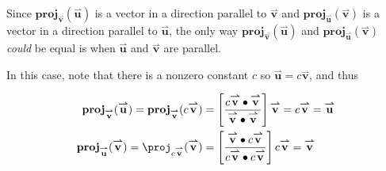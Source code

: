 \documentclass{ximera}
\begin{document}
\begin{exercise}
\begin{selectAll}
\begin{hint}
\begin{problem}
\begin{question}
\begin{itemize}
Since $\mathbf{proj}_{\overset{\boldsymbol{\rightharpoonup}}{\mathbf{v}}}(\overset{\boldsymbol{\rightharpoonup}}{\mathbf{u}})$ is a vector in a direction parallel to $\overset{\boldsymbol{\rightharpoonup}}{\mathbf{v}}$ and $\mathbf{proj}_{\overset{\boldsymbol{\rightharpoonup}}{\mathbf{u}}}(\overset{\boldsymbol{\rightharpoonup}}{\mathbf{v}})$ is a vector in a direction parallel to $\overset{\boldsymbol{\rightharpoonup}}{\mathbf{u}}$, the only way  $\mathbf{proj}_{\overset{\boldsymbol{\rightharpoonup}}{\mathbf{v}}}(\overset{\boldsymbol{\rightharpoonup}}{\mathbf{u}})$ and $\mathbf{proj}_{\overset{\boldsymbol{\rightharpoonup}}{\mathbf{u}}}(\overset{\boldsymbol{\rightharpoonup}}{\mathbf{v}})$ \emph{could} be equal is when $\overset{\boldsymbol{\rightharpoonup}}{\mathbf{u}}$ and $\overset{\boldsymbol{\rightharpoonup}}{\mathbf{v}}$ are parallel.

In this case, note that there is a nonzero constant $c$ so $\overset{\boldsymbol{\rightharpoonup}}{\mathbf{u}} = c \overset{\boldsymbol{\rightharpoonup}}{\mathbf{v}}$, and thus

\begin{align*}
\mathbf{proj}_{\overset{\boldsymbol{\rightharpoonup}}{\mathbf{v}}}(\overset{\boldsymbol{\rightharpoonup}}{\mathbf{u}}) = \mathbf{proj}_{\overset{\boldsymbol{\rightharpoonup}}{\mathbf{v}}}(c\overset{\boldsymbol{\rightharpoonup}}{\mathbf{v}}) &=\left[\frac{c\overset{\boldsymbol{\rightharpoonup}}{\mathbf{v}} \bullet \overset{\boldsymbol{\rightharpoonup}}{\mathbf{v}}}{\overset{\boldsymbol{\rightharpoonup}}{\mathbf{v}} \bullet \overset{\boldsymbol{\rightharpoonup}}{\mathbf{v}}}\right] \overset{\boldsymbol{\rightharpoonup}}{\mathbf{v}} = c \overset{\boldsymbol{\rightharpoonup}}{\mathbf{v}} = \overset{\boldsymbol{\rightharpoonup}}{\mathbf{u}}\\
\mathbf{proj}_{\overset{\boldsymbol{\rightharpoonup}}{\mathbf{u}}}(\overset{\boldsymbol{\rightharpoonup}}{\mathbf{v}}) = \proj_{c\overset{\boldsymbol{\rightharpoonup}}{\mathbf{v}}}(\overset{\boldsymbol{\rightharpoonup}}{\mathbf{v}}) &= \left[\frac{\overset{\boldsymbol{\rightharpoonup}}{\mathbf{v}} \bullet c\overset{\boldsymbol{\rightharpoonup}}{\mathbf{v}}}{c\overset{\boldsymbol{\rightharpoonup}}{\mathbf{v}} \bullet c\overset{\boldsymbol{\rightharpoonup}}{\mathbf{v}}}\right] c \overset{\boldsymbol{\rightharpoonup}}{\mathbf{v}} = \overset{\boldsymbol{\rightharpoonup}}{\mathbf{v}}\\
\end{align*}


\end{itemize}
\end{question}
\end{problem}
\end{hint}
\end{selectAll}
\end{exercise}
\end{document}
